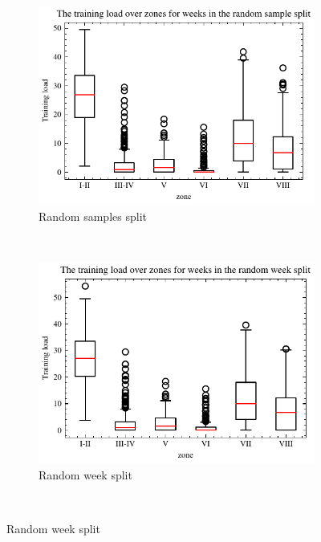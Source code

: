 \begin{figure}[ht]
    \centering
    \begin{subfigure}[t]{0.48\textwidth}
        \centering
        \includegraphics[width=\textwidth]{chapters/figures/data_exploration/random_sample_zone_boxplot.pdf}
        \captionsetup{width=.9\linewidth}
        \caption{Random samples split}
    \end{subfigure}%
    ~ 
    \begin{subfigure}[t]{0.48\textwidth}
        \centering
        \includegraphics[width=\textwidth]{chapters/figures/data_exploration/random_week_zone_boxplot.pdf}
        \captionsetup{width=.9\linewidth}
        \caption{Random week split}
    \end{subfigure}\\[1ex]

\end{figure}
